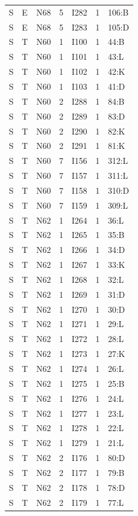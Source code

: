 {\begin{longtable}{lllrlrp{.35\linewidth}}
S & E & N68 & 5 & I282 & 1 & 106:B \\
S & E & N68 & 5 & I283 & 1 & 105:D \\
S & T & N60 & 1 & I100 & 1 & 44:B \\
S & T & N60 & 1 & I101 & 1 & 43:L \\
S & T & N60 & 1 & I102 & 1 & 42:K \\
S & T & N60 & 1 & I103 & 1 & 41:D \\
S & T & N60 & 2 & I288 & 1 & 84:B \\
S & T & N60 & 2 & I289 & 1 & 83:D \\
S & T & N60 & 2 & I290 & 1 & 82:K \\
S & T & N60 & 2 & I291 & 1 & 81:K \\
S & T & N60 & 7 & I156 & 1 & 312:L \\
S & T & N60 & 7 & I157 & 1 & 311:L \\
S & T & N60 & 7 & I158 & 1 & 310:D \\
S & T & N60 & 7 & I159 & 1 & 309:L \\
S & T & N62 & 1 & I264 & 1 & 36:L \\
S & T & N62 & 1 & I265 & 1 & 35:B \\
S & T & N62 & 1 & I266 & 1 & 34:D \\
S & T & N62 & 1 & I267 & 1 & 33:K \\
S & T & N62 & 1 & I268 & 1 & 32:L \\
S & T & N62 & 1 & I269 & 1 & 31:D \\
S & T & N62 & 1 & I270 & 1 & 30:D \\
S & T & N62 & 1 & I271 & 1 & 29:L \\
S & T & N62 & 1 & I272 & 1 & 28:L \\
S & T & N62 & 1 & I273 & 1 & 27:K \\
S & T & N62 & 1 & I274 & 1 & 26:L \\
S & T & N62 & 1 & I275 & 1 & 25:B \\
S & T & N62 & 1 & I276 & 1 & 24:L \\
S & T & N62 & 1 & I277 & 1 & 23:L \\
S & T & N62 & 1 & I278 & 1 & 22:L \\
S & T & N62 & 1 & I279 & 1 & 21:L \\
S & T & N62 & 2 & I176 & 1 & 80:D \\
S & T & N62 & 2 & I177 & 1 & 79:B \\
S & T & N62 & 2 & I178 & 1 & 78:D \\
S & T & N62 & 2 & I179 & 1 & 77:L \\

\end{longtable}}
